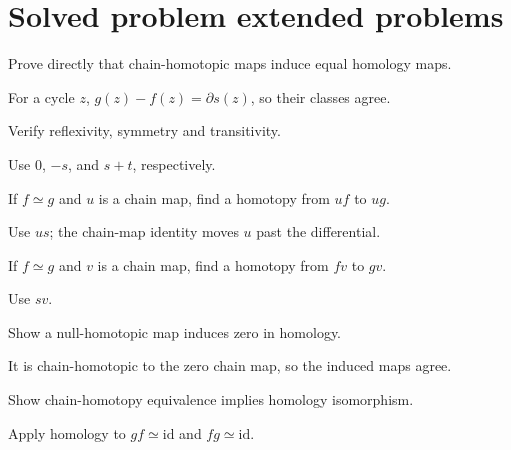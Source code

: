\section{Solved problem extended problems}

\begin{problem}\label{prob:viii22-01}
Prove directly that chain-homotopic maps induce equal homology maps.
\end{problem}
\begin{solution}
For a cycle \(z\), \(g(z)-f(z)=\partial s(z)\), so their classes agree.
\end{solution}

\begin{problem}\label{prob:viii22-02}
Verify reflexivity, symmetry and transitivity.
\end{problem}
\begin{solution}
Use \(0\), \(-s\), and \(s+t\), respectively.
\end{solution}

\begin{problem}[Postcomposition]\label{prob:viii22-03}
If \(f\simeq g\) and \(u\) is a chain map, find a homotopy from \(uf\) to \(ug\).
\end{problem}
\begin{solution}
Use \(us\); the chain-map identity moves \(u\) past the differential.
\end{solution}

\begin{problem}[Precomposition]\label{prob:viii22-04}
If \(f\simeq g\) and \(v\) is a chain map, find a homotopy from \(fv\) to \(gv\).
\end{problem}
\begin{solution}
Use \(sv\).
\end{solution}

\begin{problem}\label{prob:viii22-05}
Show a null-homotopic map induces zero in homology.
\end{problem}
\begin{solution}
It is chain-homotopic to the zero chain map, so the induced maps agree.
\end{solution}

\begin{problem}\label{prob:viii22-06}
Show chain-homotopy equivalence implies homology isomorphism.
\end{problem}
\begin{solution}
Apply homology to \(gf\simeq\mathrm{id}\) and \(fg\simeq\mathrm{id}\).
\end{solution}

